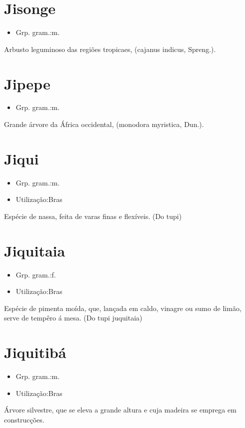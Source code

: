\documentclass{article}
\begin{document}
\section{Jisonge}
\begin{itemize}
\item {Grp. gram.:m.}
\end{itemize}
Arbusto leguminoso das regiões tropicaes, (\textunderscore cajanus indicus\textunderscore , Spreng.).
\section{Jipepe}
\begin{itemize}
\item {Grp. gram.:m.}
\end{itemize}
Grande árvore da África occidental, (\textunderscore monodora myristica\textunderscore , Dun.).
\section{Jiqui}
\begin{itemize}
\item {Grp. gram.:m.}
\end{itemize}
\begin{itemize}
\item {Utilização:Bras}
\end{itemize}
Espécie de nassa, feita de varas finas e flexíveis.
(Do tupi)
\section{Jiquitaia}
\begin{itemize}
\item {Grp. gram.:f.}
\end{itemize}
\begin{itemize}
\item {Utilização:Bras}
\end{itemize}
Espécie de pimenta moída, que, lançada em caldo, vinagre ou sumo de limão, serve de tempêro á mesa.
(Do tupi \textunderscore juquitaia\textunderscore )
\section{Jiquitibá}
\begin{itemize}
\item {Grp. gram.:m.}
\end{itemize}
\begin{itemize}
\item {Utilização:Bras}
\end{itemize}
Árvore silvestre, que se eleva a grande altura e cuja madeira se emprega em construcções.
\end{document}
